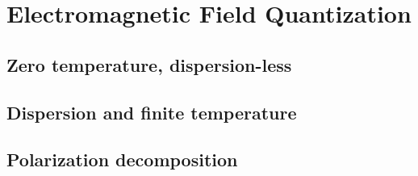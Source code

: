 \chapter{Electromagnetic Field Quantization}

    \section{Zero temperature, dispersion-less}
    \section{Dispersion and finite temperature}
    \section{Polarization decomposition}
